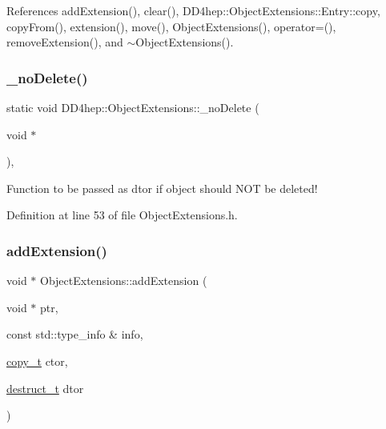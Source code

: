 References add\+Extension(), clear(), D\+D4hep\+::\+Object\+Extensions\+::\+Entry\+::copy, copy\+From(), extension(), move(), Object\+Extensions(), operator=(), remove\+Extension(), and $\sim$\+Object\+Extensions().

\hypertarget{class_d_d4hep_1_1_object_extensions_a0c32fb2af89407102b494ab9c15f9eac}{}\label{class_d_d4hep_1_1_object_extensions_a0c32fb2af89407102b494ab9c15f9eac} 
\subsubsection{\texorpdfstring{\+\_\+no\+Delete()}{\_noDelete()}}
{\footnotesize\ttfamily static void D\+D4hep\+::\+Object\+Extensions\+::\+\_\+no\+Delete (\begin{DoxyParamCaption}\item[{void $\ast$}]{ }\end{DoxyParamCaption})\hspace{0.3cm}{\ttfamily [inline]}, {\ttfamily [static]}}



Function to be passed as dtor if object should N\+OT be deleted! 



Definition at line 53 of file Object\+Extensions.\+h.

\hypertarget{class_d_d4hep_1_1_object_extensions_acfe9fe435a30ca5fedd0678b867732a0}{}\label{class_d_d4hep_1_1_object_extensions_acfe9fe435a30ca5fedd0678b867732a0} 
\subsubsection{\texorpdfstring{add\+Extension()}{addExtension()}\hspace{0.1cm}{\footnotesize\ttfamily [1/2]}}
{\footnotesize\ttfamily void $\ast$ Object\+Extensions\+::add\+Extension (\begin{DoxyParamCaption}\item[{void $\ast$}]{ptr,  }\item[{const std\+::type\+\_\+info \&}]{info,  }\item[{\hyperlink{class_d_d4hep_1_1_object_extensions_afb8207da7e2d6d5e3018cc7b5c997f6d}{copy\+\_\+t}}]{ctor,  }\item[{\hyperlink{class_d_d4hep_1_1_object_extensions_a705a3524f9097577069a83993a39a9b2}{destruct\+\_\+t}}]{dtor }\end{DoxyParamCaption})}



